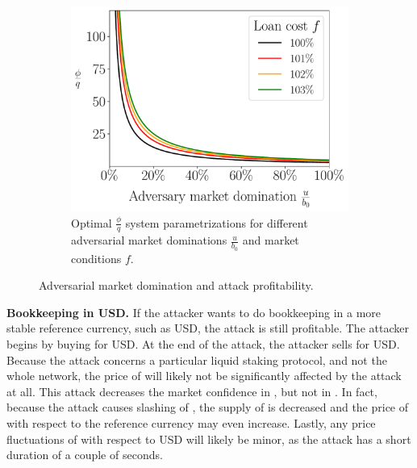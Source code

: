 
\begin{figure}[htb]
  \centering
  \hfill
  \begin{subfigure}{0.5\textwidth}
    \includegraphics[width=\textwidth]{./figures/multiplef_plotu.pdf}
    \caption{Optimal $\frac{\phi}{q}$ system parametrizations
             for different adversarial market dominations $\frac{u}{b_0}$
             and market conditions $f$.}
    \label{fig:compare-f-plotu}
  \end{subfigure}
  \caption{Adversarial market domination and attack profitability.}
  \label{fig:plotu}
\end{figure}



\noindent
\textbf{Bookkeeping in USD.}
If the attacker wants to do bookkeeping in a more stable reference currency,
such as USD, the attack is still profitable. The attacker begins by buying
\asset for USD. At the end of the attack, the attacker sells \asset for USD.
Because the attack concerns a particular liquid staking protocol, and
not the whole \asset network, the price of \asset will likely not
be significantly affected by the attack at all.
This attack decreases the market confidence in \stasset,
but not in \asset.
In fact, because
the attack causes slashing of \asset, the supply of \asset is decreased
and the price of \asset with respect to the reference currency may
even increase.
Lastly, any price fluctuations of \asset with respect to USD will likely be
minor, as the attack has a short duration of a couple of seconds.

